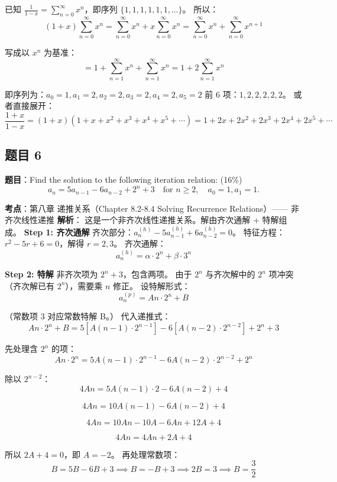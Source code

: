 \documentclass[10pt,a4paper,openany]{ctexbook}
\theoremstyle{definition}
\theoremstyle{remark}
\begin{document}
已知 $\displaystyle \frac{1}{1 - x} = \sum_{n=0}^{\infty} x^n$，即序列 $\{1, 1, 1, 1, 1, 1, \ldots\}$。
所以：
\[
(1 + x) \sum_{n=0}^{\infty} x^n = \sum_{n=0}^{\infty} x^n + x \sum_{n=0}^{\infty} x^n = \sum_{n=0}^{\infty} x^n + \sum_{n=0}^{\infty} x^{n+1}
\]

写成以 $x^n$ 为基准：
\[
= 1 + \sum_{n=1}^{\infty} x^n + \sum_{n=1}^{\infty} x^n = 1 + 2 \sum_{n=1}^{\infty} x^n
\]

即序列为：$a_0 = 1, a_1 = 2, a_2 = 2, a_3 = 2, a_4 = 2, a_5 = 2$
前 6 项：\textbf{$1, 2, 2, 2, 2, 2$}。
或者直接展开：
\[
\frac{1+x}{1-x} = (1+x)(1 + x + x^2 + x^3 + x^4 + x^5 + \cdots) = 1 + 2x + 2x^2 + 2x^3 + 2x^4 + 2x^5 + \cdots
\]

\vspace{-2pt}

\subsection{题目 6}

\textbf{题目}：Find the solution to the following iteration relation: (16\%)
\[
a_n = 5a_{n-1} - 6a_{n-2} + 2^n + 3 \quad \text{for } n \geq 2, \quad a_0 = 1, a_1 = 1.
\]

\textbf{考点}：第八章 递推关系（Chapter 8.2-8.4 Solving Recurrence Relations）—— 非齐次线性递推
\textbf{解析}：
这是一个非齐次线性递推关系。解由齐次通解 + 特解组成。
\textbf{Step 1: 齐次通解}
齐次部分：$a_n^{(h)} - 5a_{n-1}^{(h)} + 6a_{n-2}^{(h)} = 0$。
特征方程：$r^2 - 5r + 6 = 0$，解得 $r = 2, 3$。
齐次通解：
\[
a_n^{(h)} = \alpha \cdot 2^n + \beta \cdot 3^n
\]

\textbf{Step 2: 特解}
非齐次项为 $2^n + 3$，包含两项。
由于 $2^n$ 与齐次解中的 $2^n$ 项冲突（齐次解已有 $2^n$），需要乘 $n$ 修正。
设特解形式：
\[
a_n^{(p)} = An \cdot 2^n + B
\]

（常数项 3 对应常数特解 B。）
代入递推式：
\[
An \cdot 2^n + B = 5[A(n-1) \cdot 2^{n-1}] - 6[A(n-2) \cdot 2^{n-2}] + 2^n + 3
\]

先处理含 $2^n$ 的项：
\[
An \cdot 2^n = 5A(n-1) \cdot 2^{n-1} - 6A(n-2) \cdot 2^{n-2} + 2^n
\]

除以 $2^{n-2}$：
\[
4An = 5A(n-1) \cdot 2 - 6A(n-2) + 4
\]

\[
4An = 10A(n-1) - 6A(n-2) + 4
\]

\[
4An = 10An - 10A - 6An + 12A + 4
\]

\[
4An = 4An + 2A + 4
\]

所以 $2A + 4 = 0$，即 $A = -2$。
再处理常数项：
\[
B = 5B - 6B + 3 \implies B = -B + 3 \implies 2B = 3 \implies B = \frac{3}{2}
\]
\end{document}
